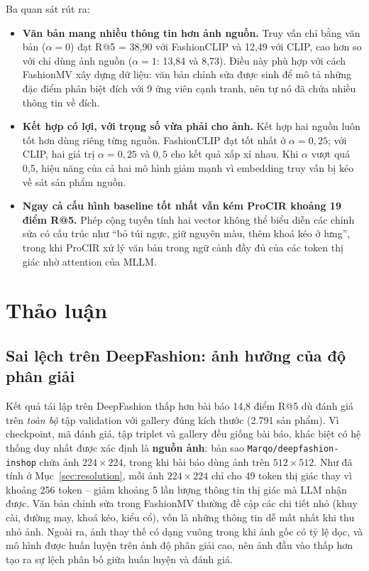 Ba quan sát rút ra:
\begin{itemize}
    \item \textbf{Văn bản mang nhiều thông tin hơn ảnh nguồn.} Truy vấn chỉ bằng văn bản ($\alpha = 0$) đạt R@5 = 38,90 với FashionCLIP và 12,49 với CLIP, cao hơn so với chỉ dùng ảnh nguồn ($\alpha = 1$: 13,84 và 8,73). Điều này phù hợp với cách FashionMV xây dựng dữ liệu: văn bản chỉnh sửa được sinh để mô tả những đặc điểm phân biệt đích với 9 ứng viên cạnh tranh, nên tự nó đã chứa nhiều thông tin về đích.
    \item \textbf{Kết hợp có lợi, với trọng số vừa phải cho ảnh.} Kết hợp hai nguồn luôn tốt hơn dùng riêng từng nguồn. FashionCLIP đạt tốt nhất ở $\alpha = 0{,}25$; với CLIP, hai giá trị $\alpha = 0{,}25$ và $0{,}5$ cho kết quả xấp xỉ nhau. Khi $\alpha$ vượt quá 0,5, hiệu năng của cả hai mô hình giảm mạnh vì embedding truy vấn bị kéo về sát sản phẩm nguồn.
    \item \textbf{Ngay cả cấu hình baseline tốt nhất vẫn kém ProCIR khoảng 19 điểm R@5.} Phép cộng tuyến tính hai vector không thể biểu diễn các chỉnh sửa có cấu trúc như ``bỏ túi ngực, giữ nguyên màu, thêm khoá kéo ở lưng'', trong khi ProCIR xử lý văn bản trong ngữ cảnh đầy đủ của các token thị giác nhờ attention của MLLM.
\end{itemize}

\section{Thảo luận}\label{sec:discussion}

\subsection{Sai lệch trên DeepFashion: ảnh hưởng của độ phân giải}

Kết quả tái lập trên DeepFashion thấp hơn bài báo 14,8 điểm R@5 dù đánh giá trên \emph{toàn bộ} tập validation với gallery đúng kích thước (2.791 sản phẩm). Vì checkpoint, mã đánh giá, tập triplet và gallery đều giống bài báo, khác biệt có hệ thống duy nhất được xác định là \textbf{nguồn ảnh}: bản sao \texttt{Marqo/deepfashion-inshop} chứa ảnh $224 \times 224$, trong khi bài báo dùng ảnh trên $512 \times 512$. Như đã tính ở Mục~\ref{sec:resolution}, mỗi ảnh $224 \times 224$ chỉ cho 49 token thị giác thay vì khoảng 256 token -- giảm khoảng 5 lần lượng thông tin thị giác mà LLM nhận được. Văn bản chỉnh sửa trong FashionMV thường đề cập các chi tiết nhỏ (khuy cài, đường may, khoá kéo, kiểu cổ), vốn là những thông tin dễ mất nhất khi thu nhỏ ảnh. Ngoài ra, ảnh thay thế có dạng vuông trong khi ảnh gốc có tỷ lệ dọc, và mô hình được huấn luyện trên ảnh độ phân giải cao, nên ảnh đầu vào thấp hơn tạo ra sự lệch phân bố giữa huấn luyện và đánh giá.

